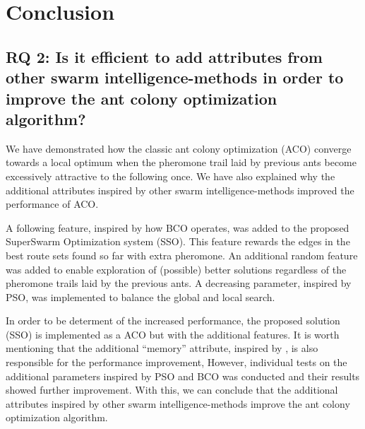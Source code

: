 \section{Conclusion}



\subsection*{RQ 2: Is it efficient to add attributes from other swarm intelligence-methods in order to improve the ant colony optimization algorithm?}

We have demonstrated how the classic ant colony optimization (ACO) converge towards a local optimum when the pheromone trail laid by previous ants become excessively attractive to the following once. We have also explained why the additional attributes inspired by other swarm intelligence-methods improved the performance of ACO. \newline

A following feature, inspired by how BCO operates, was added to the proposed SuperSwarm Optimization system (SSO). This feature rewards the edges in the best route sets found so far with extra pheromone. An additional random feature was added to enable exploration of (possible) better solutions regardless of the pheromone trails laid by the previous ants. A decreasing parameter, inspired by PSO, was implemented to balance the global and local search. \newline


In order to be determent of the increased performance, the proposed solution (SSO) is implemented as a ACO but with the additional features. It is worth mentioning that the additional ``memory'' attribute, inspired by \citet{dorigo96, sedighpour14, poorzahedy11, salehinejad10}, is also responsible for the performance improvement, However, individual tests on the additional parameters inspired by PSO and BCO was conducted and their results showed further improvement. With this, we can conclude that the additional attributes inspired by other swarm intelligence-methods improve the ant colony optimization algorithm. 

